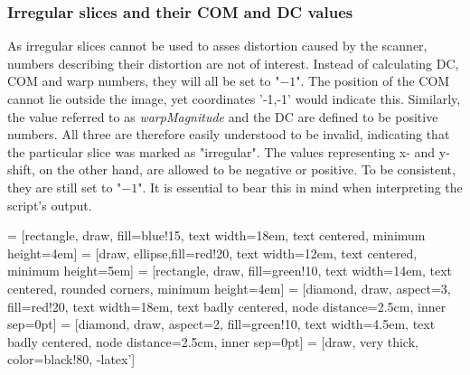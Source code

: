 \subsubsection{Irregular slices and their COM and DC values}
As irregular slices cannot be used to asses distortion caused by the scanner, numbers describing their distortion are not of interest.
Instead of calculating DC, COM and warp numbers, they will all be set to "$-1$".
The position of the COM cannot lie outside the image, yet coordinates '-1,-1' would indicate this.
Similarly, the value referred to as \textit{warpMagnitude} and the DC are defined to be positive numbers.
All three are therefore easily understood to be invalid, indicating that the particular slice was marked as "irregular".
The values representing x- and y-shift, on the other hand, are allowed to be negative or positive.
To be consistent, they are still set to "$-1$".
It is essential to bear this in mind when interpreting the script's output.

 = [rectangle, draw, fill=blue!15, text width=18em, text centered, minimum height=4em]
 = [draw, ellipse,fill=red!20, text width=12em, text centered, minimum height=5em]
 = [rectangle, draw, fill=green!10, text width=14em, text centered, rounded corners, minimum height=4em]
 = [diamond, draw, aspect=3, fill=red!20, text width=18em, text badly centered, node distance=2.5cm, inner sep=0pt]
 = [diamond, draw, aspect=2, fill=green!10, text width=4.5em, text badly centered, node distance=2.5cm, inner sep=0pt]
 = [draw, very thick, color=black!80, -latex']

